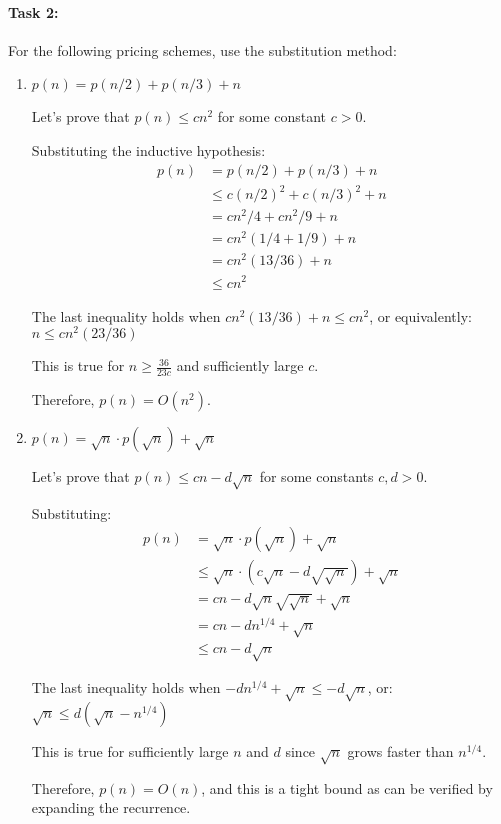 \documentclass{article}
\theoremstyle{definition}
\begin{document}
\paragraph{Task 2:} For the following pricing schemes, use the substitution method:
\begin{enumerate}
    \item $p(n) = p(n/2) + p(n/3) + n$ 
    
    Let's prove that $p(n) \leq cn^2$ for some constant $c > 0$.
    
    Substituting the inductive hypothesis:
    \begin{align*}
        p(n) &= p(n/2) + p(n/3) + n \\
        &\leq c(n/2)^2 + c(n/3)^2 + n \\
        &= cn^2/4 + cn^2/9 + n \\
        &= cn^2(1/4 + 1/9) + n \\
        &= cn^2(13/36) + n \\
        &\leq cn^2
    \end{align*}
    
    The last inequality holds when $cn^2(13/36) + n \leq cn^2$, or equivalently:
    $n \leq cn^2(23/36)$
    
    This is true for $n \geq \frac{36}{23c}$ and sufficiently large $c$.
    
    Therefore, $p(n) = O(n^2)$.
    \item $p(n) = \sqrt{n}\cdot p(\sqrt{n}) + \sqrt{n}$
    
    Let's prove that $p(n) \leq cn - d\sqrt{n}$ for some constants $c,d > 0$.
    
    Substituting:
    \begin{align*}
        p(n) &= \sqrt{n}\cdot p(\sqrt{n}) + \sqrt{n} \\
        &\leq \sqrt{n}\cdot (c\sqrt{n} - d\sqrt{\sqrt{n}}) + \sqrt{n} \\
        &= cn - d\sqrt{n}\sqrt{\sqrt{n}} + \sqrt{n} \\
        &= cn - d n^{1/4} + \sqrt{n} \\
        &\leq cn - d\sqrt{n}
    \end{align*}
    
    The last inequality holds when $-d n^{1/4} + \sqrt{n} \leq -d\sqrt{n}$, or:
    $\sqrt{n} \leq d({\sqrt{n}} - n^{1/4})$
    
    This is true for sufficiently large $n$ and $d$ since $\sqrt{n}$ grows faster than $n^{1/4}$.
    
    Therefore, $p(n) = O(n)$, and this is a tight bound as can be verified by expanding the recurrence.
\end{enumerate}
\end{document}
